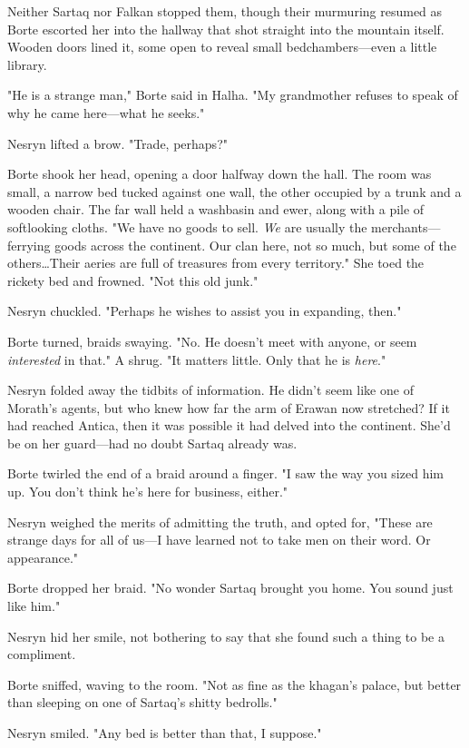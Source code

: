 Neither Sartaq nor Falkan stopped them, though their murmuring resumed as Borte escorted her into the hallway that shot straight into the mountain itself.
Wooden doors lined it, some open to reveal small bedchambers---even a little library.

"He is a strange man," Borte said in Halha.
"My grandmother refuses to speak of why he came here---what he seeks."

Nesryn lifted a brow.
"Trade, perhaps?"

Borte shook her head, opening a door halfway down the hall.
The room was small, a narrow bed tucked against one wall, the other occupied by a trunk and a wooden chair.
The far wall held a washbasin and ewer, along with a pile of softlooking cloths.
"We have no goods to sell.
\emph{We}
are usually the merchants--- ferrying goods across the continent.
Our clan here, not so much, but some of the others\ldots Their aeries are full of treasures from every territory."
She toed the rickety bed and frowned.
"Not this old junk."

Nesryn chuckled.
"Perhaps he wishes to assist you in expanding, then."

Borte turned, braids swaying.
"No.
He doesn't meet with anyone, or seem \emph{interested} in that."
A shrug.
"It matters little.
Only that he is \emph{here}."

Nesryn folded away the tidbits of information.
He didn't seem like one of Morath's agents, but who knew how far the arm of Erawan now stretched?
If it had reached Antica, then it was possible it had delved into the continent.
She'd be on her guard---had no doubt Sartaq already was.

Borte twirled the end of a braid around a finger.
"I saw the way you sized him up.
You don't think he's here for business, either."

Nesryn weighed the merits of admitting the truth, and opted for, "These are strange days for all of us---I have learned not to take men on their word.
Or appearance."

Borte dropped her braid.
"No wonder Sartaq brought you home.
You sound just like him."

Nesryn hid her smile, not bothering to say that she found such a thing to be a compliment.

Borte sniffed, waving to the room.
"Not as fine as the khagan's palace, but better than sleeping on one of Sartaq's shitty bedrolls."

Nesryn smiled.
"Any bed is better than that, I suppose."

